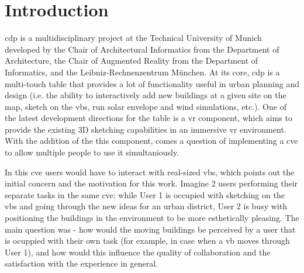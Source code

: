 

\chapter{Introduction}
\begin{comment}
Chapter plan:
-Context: introduce CDP, explain the need for the VR collaboration component
-Problem description: explain that virtual working environment provides only limited information from the workspace (citing works on Workspace Awareness). Example/Motivation: giant buildings moving at and through you

-Research question??

-Hypothesis: hypothesise that additional auditory cues promote workspace awareness in collaborative VR
-Thesis Overview: provide a high-level overview of the contents of this thesis (Chapter 1 is about.., Chapter 2 is about..)
\end{comment}

\gls{cdp} is a multidisciplinary project at the Technical University of Munich developed by the Chair of Architectural Informatics from the Department of Architecture, the Chair of Augmented Reality from the Department of Informatics, and the Leibniz-Rechnenzentrum M{\"u}nchen.
At its core, \gls{cdp} is a multi-touch table \cite[p.~5]{lampe_cdp//vr-sketching_2017} that provides a lot of  functionality useful in urban planning and design (i.e. the ability to interactively add new buildings at a given site on the map, sketch on the \gls{vb}s, run solar envelope and wind simulations, etc.). One of the latest  development directions for the table is a \gls{vr} component, which aims to provide the existing 3D sketching capabilities in an immersive \gls{vr} environment. With the addition of the this component, comes a question of implementing a \gls{cve} to allow multiple people to use it simultaniously.


 In this \gls{cve} users would have to interact with real-sized \gls{vb}s, which points out the initial concern and the motivation for this work. Imagine 2 users performing their separate tasks in the same \gls{cve}: while User 1 is occupied with sketching on the \gls{vb}s and going through the new ideas for an urban district, User 2 is busy with positioning the buildings in the environment to be more esthetically pleasing. The main question was - how would the moving buildings be perceived by a user that is ocuppied with their own task (for example, in case when a \gls{vb} moves through User 1), and how would this influence the quality of collaboration and the satisfaction with the experience in general.  
 

